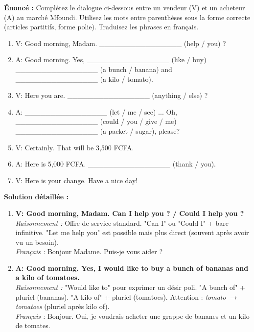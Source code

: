 \documentclass[11pt]{article}
\newcommand{\cle}[1]{{\popxbold\color{popdark}#1}}
\begin{document}
\begin{exoresolu}
    \textbf{Énoncé :} Complétez le dialogue ci-dessous entre un vendeur (V) et un acheteur (A) au marché Mfoundi. Utilisez les mots entre parenthèses sous la forme correcte (articles partitifs, forme polie). Traduisez les phrases en français.
    \begin{enumerate}
        \item V: Good morning, Madam. \_\_\_\_\_\_\_\_\_\_\_\_\_\_\_\_ (help / you) ?
        \item A: Good morning. Yes, \_\_\_\_\_\_\_\_\_\_\_\_\_\_\_\_ (like / buy) \_\_\_\_\_\_\_\_\_\_\_\_\_\_\_\_ (a bunch / banana) and \_\_\_\_\_\_\_\_\_\_\_\_\_\_\_\_ (a kilo / tomato).
        \item V: Here you are. \_\_\_\_\_\_\_\_\_\_\_\_\_\_\_\_ (anything / else) ?
        \item A: \_\_\_\_\_\_\_\_\_\_\_\_\_\_\_\_ (let / me / see) ... Oh, \_\_\_\_\_\_\_\_\_\_\_\_\_\_\_\_ (could / you / give / me) \_\_\_\_\_\_\_\_\_\_\_\_\_\_\_\_ (a packet / sugar), please?
        \item V: Certainly. That will be 3,500 FCFA.
        \item A: Here is 5,000 FCFA. \_\_\_\_\_\_\_\_\_\_\_\_\_\_\_\_ (thank / you).
        \item V: Here is your change. Have a nice day!
    \end{enumerate}
    \tcblower
    \textbf{Solution détaillée :}
    \begin{enumerate}
        \item \textbf{V: Good morning, Madam. \cle{Can I help you} ? / \cle{Could I help you} ?} \\
              \textit{Raisonnement :} Offre de service standard. "Can I" ou "Could I" + bare infinitive. "Let me help you" est possible mais plus direct (souvent après avoir vu un besoin). \\
              \textit{Français :} Bonjour Madame. Puis-je vous aider ?
        \item \textbf{A: Good morning. Yes, \cle{I would like to buy} \cle{a bunch of bananas} and \cle{a kilo of tomatoes}.} \\
              \textit{Raisonnement :} "Would like to" pour exprimer un désir poli. "A bunch of" + pluriel (bananas). "A kilo of" + pluriel (tomatoes). Attention : \emph{tomato} $\rightarrow$ \emph{tomatoes} (pluriel après kilo of). \\
              \textit{Français :} Bonjour. Oui, je voudrais acheter une grappe de bananes et un kilo de tomates.

\end{enumerate}
\end{exoresolu}
\end{document}
